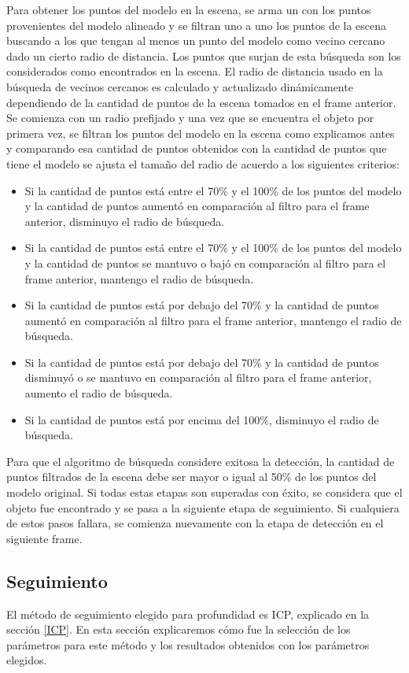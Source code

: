 Para obtener los puntos del modelo en la escena, se arma un \kdt con los puntos provenientes del modelo alineado y se filtran uno a uno los puntos de la escena buscando a los que tengan al menos un punto del modelo como vecino cercano dado un cierto radio de distancia. Los puntos que surjan de esta búsqueda son los considerados como encontrados en la escena. El radio de distancia usado en la búsqueda de vecinos cercanos es calculado y actualizado dinámicamente dependiendo de la cantidad de puntos de la escena tomados en el frame anterior. Se comienza con un radio prefijado y una vez que se encuentra el objeto por primera vez, se filtran los puntos del modelo en la escena como explicamos antes y comparando esa cantidad de puntos obtenidos con la cantidad de puntos que tiene el modelo se ajusta el tamaño del radio de acuerdo a los siguientes criterios:
\begin{itemize}
	\item Si la cantidad de puntos está entre el 70\% y el 100\% de los puntos del modelo y la cantidad de puntos aumentó en comparación al filtro para el frame anterior, disminuyo el radio de búsqueda.
	\item Si la cantidad de puntos está entre el 70\% y el 100\% de los puntos del modelo y la cantidad de puntos se mantuvo o bajó en comparación al filtro para el frame anterior, mantengo el radio de búsqueda.
	\item Si la cantidad de puntos está por debajo del 70\% y la cantidad de puntos aumentó en comparación al filtro para el frame anterior, mantengo el radio de búsqueda.
	\item Si la cantidad de puntos está por debajo del 70\% y la cantidad de puntos disminuyó o se mantuvo en comparación al filtro para el frame anterior, aumento el radio de búsqueda.
	\item Si la cantidad de puntos está por encima del 100\%, disminuyo el radio de búsqueda.
\end{itemize}

Para que el algoritmo de búsqueda considere exitosa la detección, la cantidad de puntos filtrados de la escena debe ser mayor o igual al 50\% de los puntos del modelo original. Si todas estas etapas son superadas con éxito, se considera que el objeto fue encontrado y se pasa a la siguiente etapa de seguimiento. Si cualquiera de estos pasos fallara, se comienza nuevamente con la etapa de detección en el siguiente frame.


\subsection{Seguimiento}\label{tracking_d}
El método de seguimiento elegido para profundidad es ICP, explicado en la sección \ref{ICP}. En esta sección explicaremos cómo fue la selección de los parámetros para este método y los resultados obtenidos con los parámetros elegidos.

